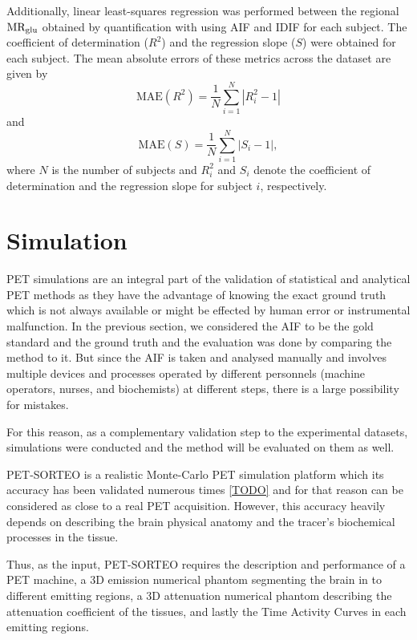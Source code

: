 Additionally, linear least-squares regression was performed between the regional \(\text{MR}_{\text{glu}}\) obtained by quantification with using AIF and IDIF for each subject. The coefficient of determination (\(R^2\)) and the regression slope (\(S\)) were obtained for each subject. The mean absolute errors of these metrics across the dataset are given by
\begin{equation}
	\text{MAE}(R^2) = \frac{1}{N} \sum_{i=1}^{N} \left| R^2_i - 1 \right|
\end{equation}
and
\begin{equation}
	\text{MAE}(S) = \frac{1}{N} \sum_{i=1}^{N} \left| S_i - 1 \right|,
\end{equation}
where $N$ is the number of subjects and \(R^2_i\) and \(S_i\) denote the coefficient of determination and the regression slope for subject \(i\), respectively.

\section{Simulation}
PET simulations are an integral part of the validation of statistical and analytical PET methods as they have the advantage of knowing the exact ground truth which is not always available or might be effected by human error or instrumental malfunction.
In the previous section, we considered the AIF to be the gold standard and the ground truth and the evaluation was done by comparing the method to it.
But since the AIF is taken and analysed manually and involves multiple devices and processes operated by different personnels (machine operators, nurses, and biochemists) at different steps, there is a large possibility for mistakes.

For this reason, as a complementary validation step to the experimental datasets, simulations were conducted and the method will be evaluated on them as well.

PET-SORTEO is a realistic Monte-Carlo PET simulation platform which its accuracy has been validated numerous times \ref{TODO} and for that reason can be considered as close to a real PET acquisition.
However, this accuracy heavily depends on describing the brain physical anatomy and the tracer's biochemical processes in the tissue.

Thus, as the input, PET-SORTEO requires the description and performance of a PET machine, a 3D emission numerical phantom segmenting the brain in to different emitting regions, a 3D attenuation numerical phantom describing the attenuation coefficient of the tissues, and lastly the Time Activity Curves in each emitting regions.

